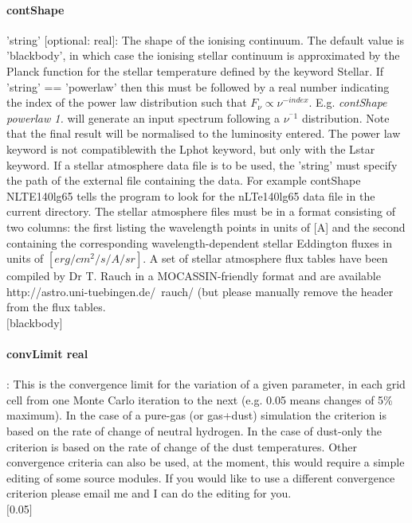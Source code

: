 \documentclass[11pt]{article}
\begin{document}
\paragraph   {contShape} 'string' [optional: real]: The shape of the ionising continuum. The default value is 
		     'blackbody', in which case the ionising stellar continuum is 
		     approximated by the Planck function for the stellar 
		     temperature defined by the keyword Stellar. If 'string' == 'powerlaw'
		     then this must be followed by a real number indicating the index of the 
		     power law distribution such that $F_{\nu} \propto \nu^{-index}$. E.g. 
		     {\it contShape powerlaw 1. } will generate an input spectrum following a $\nu^{^-1}$
		     distribution. Note that the final result will be normalised to the luminosity entered. 
		     The power law keyword is not compatiblewith the Lphot keyword, but only with the Lstar keyword.
		     If a stellar 
		     atmosphere data file is to be used, the 'string' must specify 
		     the path of the external file containing the data. For example 
		     contShape NLTE140lg65 tells the program to look for the 
		     nLTe140lg65 data file in the current directory. The stellar 
		     atmosphere files must be in a format consisting of two columns:
		     the first listing the wavelength points in units of [A] and 
		     the second containing the corresponding wavelength-dependent 
		     stellar Eddington fluxes in units of $[erg/cm^2/s/A/sr]$. A set
		     of stellar atmosphere flux tables have been compiled by Dr T. Rauch
		     in a MOCASSIN-friendly format and are available  
		     http://astro.uni-tuebingen.de/~rauch/ (but please manually remove 
		     the header from the flux tables.\\
		     $[$blackbody$]$\\

\paragraph   {convLimit real}    : This is the convergence limit for the variation of a given 
                     parameter, in each grid cell from one Monte Carlo iteration to the 
		     next (e.g. 0.05 means changes of 5\% maximum). 
		     In the case of a pure-gas (or gas+dust) simulation the criterion 
		     is based on the rate of change of neutral hydrogen. In the case of 
		     dust-only the criterion is based on the rate of change of the 
		     dust temperatures. 
		     Other convergence criteria can also be used, at the moment, 
		     this would require a simple editing of some source modules. 
		     If you would like to use a different convergence criterion 
		     please email me and I can do the editing for you. \\
		     $[$0.05$]$\\
\end{document}
